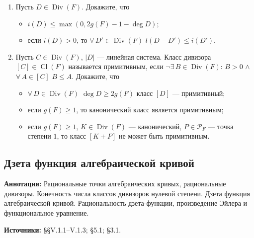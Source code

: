 \documentclass[a4paper, 12pt]{article}
\DeclareMathOperator{\Div}{Div}
\DeclareMathOperator{\Cl}{Cl}
\begin{document}
\begin{enumerate}[noitemsep,topsep=0pt]
    \item Пусть $D\in\Div(F)$. Докажите, что
    \begin{itemize}[noitemsep,topsep=0pt]
        \item $i(D)\leqslant \max(0,2g(F)-1-\deg D)$;
        \item если $i(D)>0$, то $\forall\, D'\in\Div(F)$ $l(D-D')\leqslant i(D')$.
    \end{itemize} %
    \item Пусть $C\in\Div(F)$, $|D|$ --- линейная система. Класс дивизора $[C]\in\Cl(F)$ называется примитивным, если $\neg\exists\,B\in\Div(F)$: $B>0$ $\land$ $\forall\,A\in[C]$ $B\leqslant A$. Докажите, что
    \begin{itemize}[noitemsep,topsep=0pt]
        \item $\forall\, D\in\Div(F)$ $\deg D \geqslant 2g(F)$ класс $[D]$ --- примитивный;
        \item если $g(F)\geqslant 1$, то канонический класс является примитивным;
        \item если $g(F)\geqslant 1$, $K\in\Div(F)$ --- канонический, $P\in\mathcal{P}_F$ --- точка степени $1$, то класс $[K+P]$ не может быть примитивным. 
    \end{itemize} %
\end{enumerate}

\subsection{Дзета функция алгебраической кривой}

{\bf Аннотация:} Рациональные точки алгебраических кривых, рациональные дивизоры. Конечность числа классов дивизоров нулевой степени. Дзета функция алгебраической кривой. Рациональность дзета-функции, произведение Эйлера и функциональное уравнение.

{\bf Источники:} \cite{Step} \S\S V.1.1--V.1.3; \cite{Stich} \S 5.1; \cite{VNTs} \S 3.1.
\end{document}
